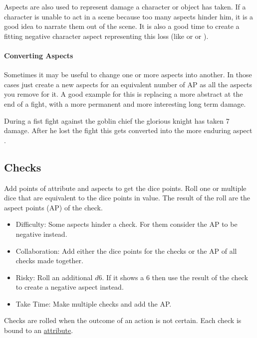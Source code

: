 \documentclass[11pt]{article}
\begin{document}
{Aspects are also used to represent damage a character or object has taken. If a character is unable to act in a scene because too many aspects hinder him, it is a good idea to narrate them out of the scene. It is also a good time to create a fitting negative character aspect representing this loss (like  or  or ).
\paragraph*{Converting Aspects}
\label{sec:orge62065e}

Sometimes it may be useful to change one or more aspects into another. In those cases just create a new aspects for an equivalent number of AP as all the aspects you remove for it.
A good example for this is replacing a more abstract  at the end of a fight, with a more permanent and more interesting long term damage.

\begin{pwexample}
During a fist fight against the goblin chief the glorious knight has taken 7 damage. After he lost the fight this gets converted into the more enduring aspect . 
\end{pwexample}
\subsection{Checks}
\label{sec:org1d27f17}
\begin{short}
Add points of attribute and aspects to get the dice points. Roll one or multiple dice that are equivalent to the dice points in value. The result of the roll are the aspect points (AP) of the check.
\begin{itemize}
\item Difficulty: Some aspects hinder a check. For them consider the AP to be negative instead.
\item Collaboration: Add either the dice points for the checks or the AP of all checks made together.
\item Risky: Roll an additional \(d6\). If it shows a \(6\) then use the result of the check to create a negative aspect instead.
\item Take Time: Make multiple checks and add the AP.
\end{itemize}
\end{short}

Checks are rolled when the outcome of an action is not certain. Each check is bound to an \hyperref[sec:org1f12fb0]{attribute}.

}
\end{document}
